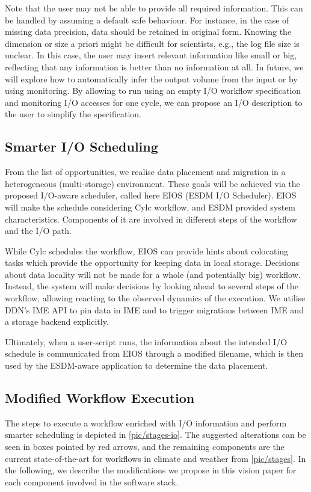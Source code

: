 \documentclass{superfri}
\begin{document}
Note that the user may not be able to provide all required information.
This can be handled by assuming a default safe behaviour.
For instance, in the case of missing data precision, data should be retained in original form.
Knowing the dimension or size a priori might be difficult for scientists, e.g., the log file size is unclear.
In this case, the user may insert relevant information like small or big, reflecting that any information is better than no information at all.
In future, we will explore how to automatically infer the output volume from the input or by using monitoring.
By allowing to run using an empty I/O workflow specification and monitoring I/O accesses for one cycle, we can propose an I/O description to the user to simplify the specification.

\subsection{Smarter I/O Scheduling}

From the list of opportunities, we realise data placement and migration in a heterogeneous (multi-storage) environment.
These goals will be achieved via the proposed I/O-aware scheduler, called here EIOS (ESDM I/O Scheduler).
EIOS will make the schedule considering Cylc workflow, and ESDM provided system characteristics.
Components of it are involved in different steps of the workflow and the I/O path.

While Cylc schedules the workflow, EIOS can provide hints about colocating tasks which provide the opportunity for keeping data in local storage.
Decisions about data locality will not be made for a whole (and potentially big) workflow.
Instead, the system will make decisions by looking ahead to several steps of the workflow, allowing reacting to the observed dynamics of the execution.
We utilise DDN's IME API to pin data in IME and to trigger migrations between IME and a storage backend explicitly.

Ultimately, when a user-script runs, the information about the intended I/O schedule is communicated from EIOS through a modified filename, which is then used by the ESDM-aware application to determine the data placement.

\subsection{Modified Workflow Execution}

The steps to execute a workflow enriched with I/O information and perform smarter scheduling is depicted in \cref{pic/stages-io}.
The suggested alterations can be seen in boxes pointed by red arrows, and the remaining components are the current state-of-the-art for workflows in climate and weather from \cref{pic/stages}.
In the following, we describe the modifications we propose in this vision paper for each component involved in the software stack.
\end{document}
